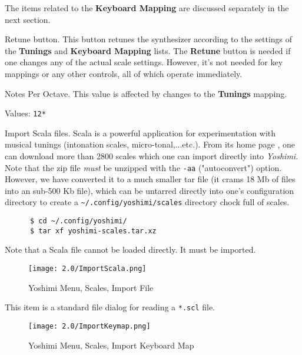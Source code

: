    The items related to the \textbf{Keyboard Mapping} are discussed
   separately in the next section.

   Retune button.
   This button retunes the synthesizer according to the settings of
   the \textbf{Tunings} and \textbf{Keyboard Mapping} lists.
   The \textbf{Retune} button is needed if one
   changes any of the actual scale settings. However, it's not needed for key
   mappings or any other controls, all of which operate immediately.

   Notes Per Octave.
   This value is affected by changes to the \textbf{Tunings} mapping.

   Values: \texttt{12*}

   Import Scala files.
   Scala is a powerful application for experimentation with musical tunings
   (intonation scales, micro-tonal,...etc.). From its home page \cite{scala},
   one can download more than 2800 scales which one can import directly into
   \textsl{Yoshimi}.  Note that the zip file \textsl{must} be unzipped with
   the \texttt{-aa} ("autoconvert") option.  However, we have converted it to a
   much smaller tar file (it crams 18 Mb of files into an sub-500 Kb file),
   which can be untarred directly into
   one's configuration directory to create a
   \texttt{\textasciitilde/.config/yoshimi/scales} directory chock full of
   scales.

    \begin{verbatim}
      $ cd ~/.config/yoshimi/
      $ tar xf yoshimi-scales.tar.xz
    \end{verbatim}

    Note that a Scala file cannot be loaded directly.  It must be imported.

\begin{figure}[H]
   \centering
   \texttt{[image: 2.0/ImportScala.png]}
   \caption{Yoshimi Menu, Scales, Import File}
   \label{fig:yoshimi_scales_import_file}
\end{figure}

   This item is a standard file dialog for reading
   a \texttt{*.scl} file.

\begin{figure}[H]
   \centering
   \texttt{[image: 2.0/ImportKeymap.png]}
   \caption{Yoshimi Menu, Scales, Import Keyboard Map}
   \label{fig:yoshimi_scales_import_keyboard_map}
\end{figure}

